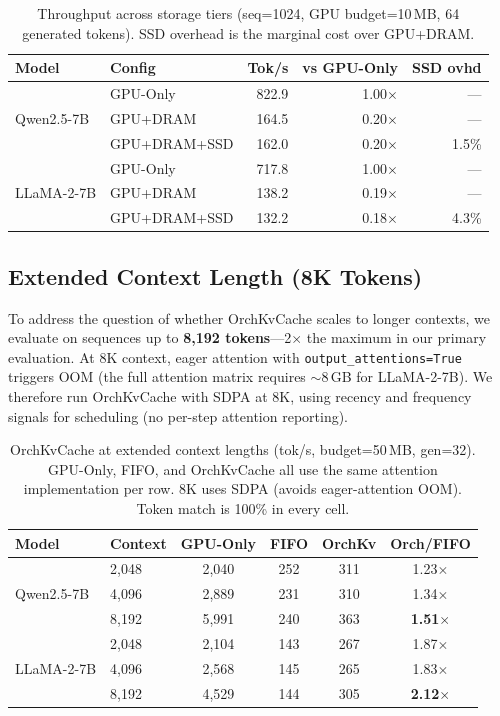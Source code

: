 \documentclass[conference]{IEEEtran}
\begin{document}
\begin{table}[t]
\centering
\caption{Throughput across storage tiers (seq=1024, GPU budget=10\,MB, 64 generated tokens). SSD overhead is the marginal cost over GPU+DRAM.}
\label{tab:tier-throughput}
\footnotesize
\setlength{\tabcolsep}{4pt}
\begin{tabular}{@{}llrrr@{}}
\toprule
Model & Config & Tok/s & vs GPU-Only & SSD ovhd \\
\midrule
\multirow{3}{*}{Qwen2.5-7B}
  & GPU-Only     & 822.9 & 1.00$\times$ & --- \\
  & GPU+DRAM     & 164.5 & 0.20$\times$ & --- \\
  & GPU+DRAM+SSD & 162.0 & 0.20$\times$ & 1.5\% \\
\midrule
\multirow{3}{*}{LLaMA-2-7B}
  & GPU-Only     & 717.8 & 1.00$\times$ & --- \\
  & GPU+DRAM     & 138.2 & 0.19$\times$ & --- \\
  & GPU+DRAM+SSD & 132.2 & 0.18$\times$ & 4.3\% \\
\bottomrule
\end{tabular}
\end{table}

\subsection{Extended Context Length (8K Tokens)}
\label{sec:scale}

To address the question of whether OrchKvCache scales to longer contexts, we evaluate on sequences up to \textbf{8{,}192 tokens}---2$\times$ the maximum in our primary evaluation. At 8K context, eager attention with \texttt{output\_attentions=True} triggers OOM (the full attention matrix requires ${\sim}$8\,GB for LLaMA-2-7B). We therefore run OrchKvCache with SDPA at 8K, using recency and frequency signals for scheduling (no per-step attention reporting).

\begin{table}[t]
\centering
\caption{OrchKvCache at extended context lengths (tok/s, budget=50\,MB, gen=32). GPU-Only, FIFO, and OrchKvCache all use the same attention implementation per row. 8K uses SDPA (avoids eager-attention OOM). Token match is 100\% in every cell.}
\label{tab:scale}
\small
\begin{tabular}{@{}llcccc@{}}
\toprule
Model & Context & GPU-Only & FIFO & OrchKv & Orch/FIFO \\
\midrule
\multirow{3}{*}{Qwen2.5-7B}
  & 2{,}048  & 2{,}040 & 252  & 311  & 1.23$\times$ \\
  & 4{,}096  & 2{,}889 & 231  & 310  & 1.34$\times$ \\
  & 8{,}192  & 5{,}991 & 240  & 363  & \textbf{1.51$\times$} \\
\midrule
\multirow{3}{*}{LLaMA-2-7B}
  & 2{,}048  & 2{,}104 & 143  & 267  & 1.87$\times$ \\
  & 4{,}096  & 2{,}568 & 145  & 265  & 1.83$\times$ \\
  & 8{,}192  & 4{,}529 & 144  & 305  & \textbf{2.12$\times$} \\
\bottomrule
\end{tabular}
\end{table}
\end{document}
